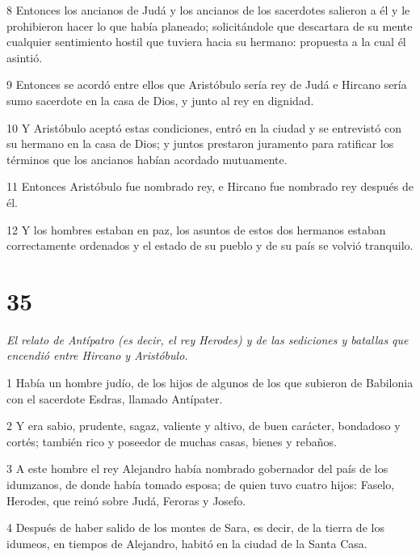 \par 8 Entonces los ancianos de Judá y los ancianos de los sacerdotes salieron a él y le prohibieron hacer lo que había planeado; solicitándole que descartara de su mente cualquier sentimiento hostil que tuviera hacia su hermano: propuesta a la cual él asintió.

\par 9 Entonces se acordó entre ellos que Aristóbulo sería rey de Judá e Hircano sería sumo sacerdote en la casa de Dios, y junto al rey en dignidad.

\par 10 Y Aristóbulo aceptó estas condiciones, entró en la ciudad y se entrevistó con su hermano en la casa de Dios; y juntos prestaron juramento para ratificar los términos que los ancianos habían acordado mutuamente.

\par 11 Entonces Aristóbulo fue nombrado rey, e Hircano fue nombrado rey después de él.

\par 12 Y los hombres estaban en paz, los asuntos de estos dos hermanos estaban correctamente ordenados y el estado de su pueblo y de su país se volvió tranquilo.

\chapter{35}

\par \textit{El relato de Antípatro (es decir, el rey Herodes) y de las sediciones y batallas que encendió entre Hircano y Aristóbulo.}

\par 1 Había un hombre judío, de los hijos de algunos de los que subieron de Babilonia con el sacerdote Esdras, llamado Antípater.

\par 2 Y era sabio, prudente, sagaz, valiente y altivo, de buen carácter, bondadoso y cortés; también rico y poseedor de muchas casas, bienes y rebaños.

\par 3 A este hombre el rey Alejandro había nombrado gobernador del país de los idumzanos, de donde había tomado esposa; de quien tuvo cuatro hijos: Faselo, Herodes, que reinó sobre Judá, Feroras y Josefo.

\par 4 Después de haber salido de los montes de Sara, es decir, de la tierra de los idumeos, en tiempos de Alejandro, habitó en la ciudad de la Santa Casa.

